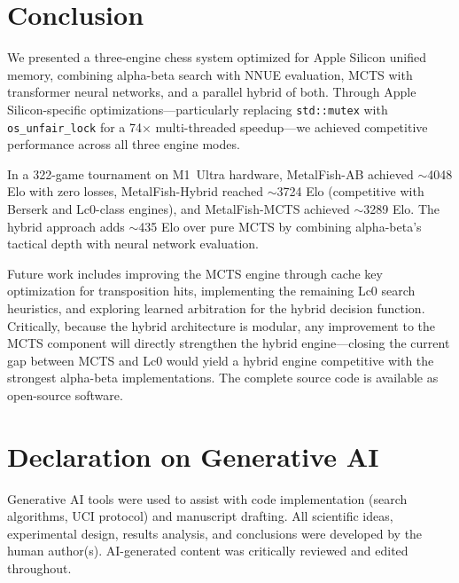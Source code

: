 \documentclass{svproc}
\begin{document}
\section{Conclusion}
\label{sec:conclusion}

We presented a three-engine chess system optimized for Apple Silicon unified memory, combining alpha-beta search with NNUE evaluation, MCTS with transformer neural networks, and a parallel hybrid of both. Through Apple Silicon-specific optimizations---particularly replacing \texttt{std::mutex} with \texttt{os\_unfair\_lock} for a 74$\times$ multi-threaded speedup---we achieved competitive performance across all three engine modes.

In a 322-game tournament on M1~Ultra hardware, MetalFish-AB achieved $\sim$4048 Elo with zero losses, MetalFish-Hybrid reached $\sim$3724 Elo (competitive with Berserk and Lc0-class engines), and MetalFish-MCTS achieved $\sim$3289 Elo. The hybrid approach adds $\sim$435 Elo over pure MCTS by combining alpha-beta's tactical depth with neural network evaluation.

Future work includes improving the MCTS engine through cache key optimization for transposition hits, implementing the remaining Lc0 search heuristics, and exploring learned arbitration for the hybrid decision function. Critically, because the hybrid architecture is modular, any improvement to the MCTS component will directly strengthen the hybrid engine---closing the current gap between MCTS and Lc0 would yield a hybrid engine competitive with the strongest alpha-beta implementations. The complete source code is available as open-source software.


\section*{Declaration on Generative AI}
Generative AI tools were used to assist with code implementation (search algorithms, UCI protocol) and manuscript drafting. All scientific ideas, experimental design, results analysis, and conclusions were developed by the human author(s). AI-generated content was critically reviewed and edited throughout.
\end{document}
